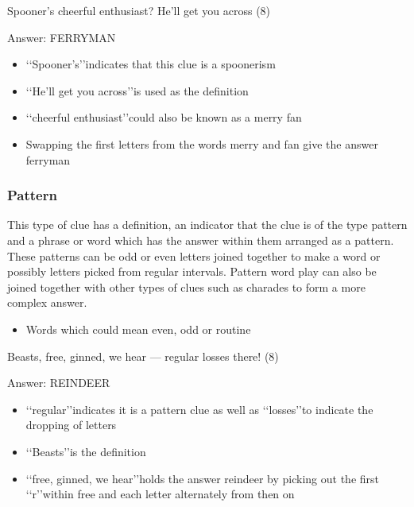
Spooner's cheerful enthusiast? He'll get you across (8) 

Answer: FERRYMAN 

\begin{itemize}
	\item \lq\lq Spooner’s\rq\rq indicates that this clue is a spoonerism 
	\item \lq\lq He’ll get you across\rq\rq is used as the definition 
	\item \lq\lq cheerful enthusiast\rq\rq could also be known as a merry fan 
	\item Swapping the first letters from the words merry and fan give the answer ferryman 
\end{itemize}

\subsubsection{Pattern}

This type of clue has a definition, an indicator that the clue is of the type pattern and a phrase or word which has the answer within them arranged as a pattern. These patterns can be odd or even letters joined together to make a word or possibly letters picked from regular intervals. Pattern word play can also be joined together with other types of clues such as charades to form a more complex answer. 

\begin{itemize} 
	\item Words which could mean even, odd or routine 
\end{itemize}


Beasts, free, ginned, we hear — regular losses there! (8) 

Answer: REINDEER 

\begin{itemize}
	\item \lq\lq regular\rq\rq indicates it is a pattern clue as well as \lq\lq losses\rq\rq to indicate the dropping of letters 
	\item \lq\lq Beasts\rq\rq is the definition 
	\item \lq\lq free, ginned, we hear\rq\rq holds the answer reindeer by picking out the first \lq\lq r\rq\rq within free and each letter alternately from then on
\end{itemize} 

